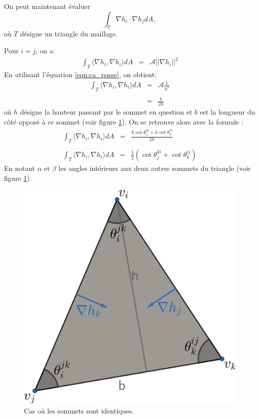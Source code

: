 On peut maintenant évaluer
$$\displaystyle\int_{T} \nabla h_i \cdot \nabla h_j dA,$$
où $T$ désigne un triangle du maillage.

Pour $i=j$, on a:
\[
\begin{array}{lcl}
\displaystyle\int_T \langle \nabla h_i, \nabla h_i \rangle dA &= &\mathcal{A}||\nabla h_i||^2
\end{array}
\]
En utilisant l'équation \ref{eqn:ca_passe}, on obtient:
\[
\begin{array}{lcl}
\displaystyle\int_T \langle \nabla h_i, \nabla h_i\rangle dA&=& \mathcal{A}\displaystyle\frac{1}{h^2} \\\\
&=& \displaystyle\frac{b}{2h}
\end{array}
\]
où \(h\) désigne la hauteur passant par le sommet en question et \(b\) est la longueur du côté opposé à ce sommet (voir figure \ref{fig:laplace_cotan_1}). On se retrouve alors avec la formule :
\[
\begin{array}{lcl}
\displaystyle\int_T \langle \nabla h_i, \nabla h_i \rangle dA  &=& \displaystyle\frac{h \cot \theta_j^{ki} + h \cot \theta_k^{ij}}{2h}\\\\
\displaystyle\int_T \langle \nabla h_i, \nabla h_i\rangle dA&=& \displaystyle\frac{1}{2} (\cot \theta_j^{ki} + \cot \theta_k^{ij})
\end{array}
\]
En notant \(\alpha\) et \(\beta\) les angles intérieurs aux deux autres sommets du triangle (voir figure \ref{fig:laplace_cotan_1}).
\begin{figure}[!h]
\centering
\includegraphics[scale=0.48]{images/laplace_cotan_1.pdf}
\caption{Cas où les sommets sont identiques.}
\label{fig:laplace_cotan_1}
\end{figure}

